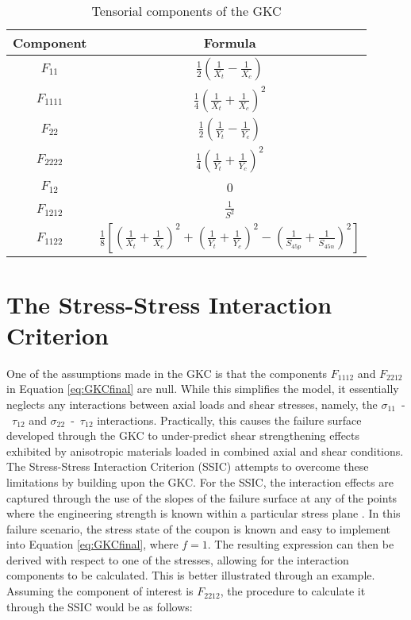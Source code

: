 \documentclass[main.tex]{subfiles}
\begin{document}
\begin{table} [h]
	\centering
	\caption{Tensorial components of the GKC}
	\begin{tabular}{ c c } 
	\toprule
		\textbf{Component} & \textbf{Formula} \\
		\midrule
		$F_{11}$ & $\frac{1}{2}(\frac{1}{X_t}-\frac{1}{X_c})$\\ [1ex]
		$F_{1111}$ & $\frac{1}{4}(\frac{1}{X_t}+\frac{1}{X_c})^2$\\ [1ex]
		$F_{22}$ & $\frac{1}{2}(\frac{1}{Y_t}-\frac{1}{Y_c})$\\ [1ex]
		$F_{2222}$ & $\frac{1}{4}(\frac{1}{Y_t}+\frac{1}{Y_c})^2$\\ [1ex]
		$F_{12}$ & 0\\ [1ex]
		$F_{1212}$ & $\frac{1}{S^2}$\\ [1ex]
		$F_{1122}$ & $\frac{1}{8}[(\frac{1}{X_t}+\frac{1}{X_c})^2+(\frac{1}{Y_t}+\frac{1}{Y_c})^2-(\frac{1}{S_{45p}}+\frac{1}{S_{45n}})^2]$\\ [1ex]
		\bottomrule
	\end{tabular}
	\label{tab:GKtens}
\end{table}
\pagebreak

\section{The Stress-Stress Interaction Criterion}\label{sec:OOC}
One of the assumptions made in the GKC is that the components $F_{1112}$ and $F_{2212}$ in Equation \ref{eq:GKCfinal} are null. While this simplifies the model, it essentially neglects any interactions between axial loads and shear stresses, namely, the $\sigma_{11}$~-~$\tau_{12}$ and $\sigma_{22}$~-~$\tau_{12}$ interactions. Practically, this causes the failure surface developed through the GKC to under-predict shear strengthening effects exhibited by anisotropic materials loaded in combined axial and shear conditions. The Stress-Stress Interaction Criterion (SSIC) attempts to overcome these limitations by building upon the GKC. For the SSIC, the interaction effects are captured through the use of the slopes of the failure surface at any of the points where the engineering strength is known within a particular stress plane \cite{Osswald2017a}. In this failure scenario, the stress state of the coupon is known and easy to implement into Equation \ref{eq:GKCfinal}, where $f=1$. The resulting expression can then be derived with respect to one of the stresses, allowing for the interaction components to be calculated. This is better illustrated through an example. Assuming the component of interest is $F_{2212}$, the procedure to calculate it through the SSIC would be as follows:
\end{document}
